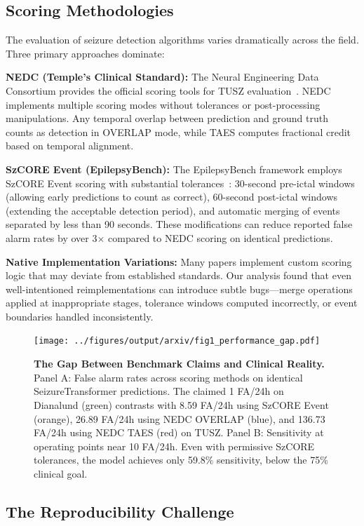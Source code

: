 \documentclass[10pt,a4paper]{article}
\begin{document}
\subsection{Scoring Methodologies}

The evaluation of seizure detection algorithms varies dramatically across the field. Three primary approaches dominate:

\textbf{NEDC (Temple's Clinical Standard):} The Neural Engineering Data Consortium provides the official scoring tools for TUSZ evaluation~\cite{shah2021nedc}. NEDC implements multiple scoring modes without tolerances or post-processing manipulations. Any temporal overlap between prediction and ground truth counts as detection in OVERLAP mode, while TAES computes fractional credit based on temporal alignment.

\textbf{SzCORE Event (EpilepsyBench):} The EpilepsyBench framework employs SzCORE Event scoring with substantial tolerances~\cite{wu2024dianalund}: 30-second pre-ictal windows (allowing early predictions to count as correct), 60-second post-ictal windows (extending the acceptable detection period), and automatic merging of events separated by less than 90 seconds. These modifications can reduce reported false alarm rates by over 3$\times$ compared to NEDC scoring on identical predictions.

\textbf{Native Implementation Variations:} Many papers implement custom scoring logic that may deviate from established standards. Our analysis found that even well-intentioned reimplementations can introduce subtle bugs---merge operations applied at inappropriate stages, tolerance windows computed incorrectly, or event boundaries handled inconsistently.

\begin{figure}[t]
    \centering
    \texttt{[image: ../figures/output/arxiv/fig1\_performance\_gap.pdf]}
    \caption{\textbf{The Gap Between Benchmark Claims and Clinical Reality.} Panel A: False alarm rates across scoring methods on identical SeizureTransformer predictions. The claimed 1 FA/24h on Dianalund (green) contrasts with 8.59 FA/24h using SzCORE Event (orange), 26.89 FA/24h using NEDC OVERLAP (blue), and 136.73 FA/24h using NEDC TAES (red) on TUSZ. Panel B: Sensitivity at operating points near 10 FA/24h. Even with permissive SzCORE tolerances, the model achieves only 59.8\% sensitivity, below the 75\% clinical goal.}
    \label{fig:performance_gap}
\end{figure}

\subsection{The Reproducibility Challenge}
\end{document}
